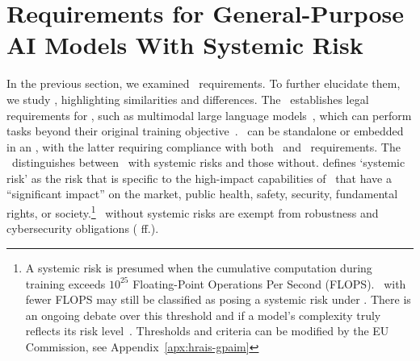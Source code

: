 
\section{Requirements for General-Purpose AI Models With Systemic Risk}\label{sec:gpai}

In the previous section, we examined \HRAIS\ requirements. To further elucidate them, we study \GPAIMSSR, highlighting similarities and differences. 
%
The \EUAIAct\ establishes legal requirements for \GPAIMS, such as multimodal large language models~\cite{openai2023gpt, team2023gemini}, which can perform tasks beyond their original training objective~\citep{gutierrez2023proposal}.
%
\GPAIM\ can be standalone or embedded in an \HRAIS, with the latter requiring compliance with both \GPAIM\ and \HRAIS\ requirements.
%
The \EUAIAct\ distinguishes between \GPAIM\ with systemic risks and those without.
% 
 defines `systemic risk' as the risk that is specific to the high-impact capabilities of \GPAIMS\ that have a ``significant impact'' on the market, public health, safety, security, fundamental rights, or society.\footnote{A systemic risk is presumed when the cumulative computation during training exceeds \(10^{25}\) Floating-Point Operations Per Second (FLOPS). \GPAIMS\ with fewer FLOPS may still be classified as posing a systemic risk under . 
There is an ongoing debate over this threshold and if a model's complexity truly reflects its risk level~\cite{hacker2024comments, novelli2024generative, pehlivan2024eu, kutterer2023regulating}. Thresholds and criteria can be modified by the EU Commission, see Appendix~\ref{apx:hrais-gpaim}
}
\GPAIMS\ without systemic risks are exempt from robustness and cybersecurity obligations ( ff.).
% 


